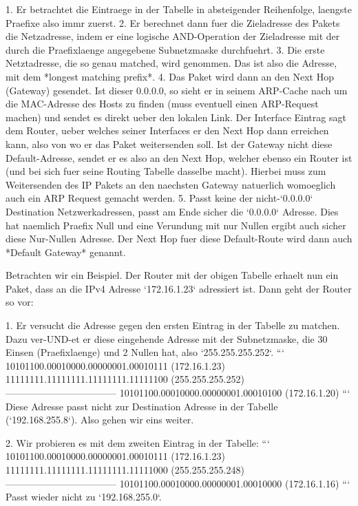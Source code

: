 1. Er betrachtet die Eintraege in der Tabelle in absteigender Reihenfolge,
   laengste Praefixe also immr zuerst.
2. Er berechnet dann fuer die Zieladresse des Pakets die Netzadresse, indem er
   eine logische AND-Operation der Zieladresse mit der durch die Praefixlaenge
   angegebene Subnetzmaske durchfuehrt.
3. Die erste Netztadresse, die so genau matched, wird genommen. Das ist also die
   Adresse, mit dem *longest matching prefix*.
4. Das Paket wird dann an den Next Hop (Gateway) gesendet. Ist dieser 0.0.0.0,
   so sieht er in seinem ARP-Cache nach um die MAC-Adresse des Hosts zu finden
   (muss eventuell einen ARP-Request machen) und sendet es direkt ueber den
   lokalen Link. Der Interface Eintrag sagt dem Router, ueber welches seiner
   Interfaces er den Next Hop dann erreichen kann, also von wo er das Paket
   weitersenden soll. Ist der Gateway nicht diese Default-Adresse, sendet er es
   also an den Next Hop, welcher ebenso ein Router ist (und bei sich fuer seine
   Routing Tabelle dasselbe macht). Hierbei muss zum Weitersenden des IP Pakets
   an den naechsten Gateway natuerlich womoeglich auch ein ARP Request gemacht
   werden.
5. Passt keine der nicht-`0.0.0.0` Destination Netzwerkadressen, passt am Ende
   sicher die `0.0.0.0` Adresse. Dies hat naemlich Praefix Null und eine Verundung
   mit nur Nullen ergibt auch sicher diese Nur-Nullen Adresse. Der Next Hop fuer
   diese Default-Route wird dann auch *Default Gateway* genannt.

Betrachten wir ein Beispiel. Der Router mit der obigen Tabelle erhaelt nun ein
Paket, dass an die IPv4 Adresse `172.16.1.23` adressiert ist. Dann geht der
Router so vor:

1. Er versucht die Adresse gegen den ersten Eintrag in der Tabelle zu
   matchen. Dazu ver-UND-et er diese eingehende Adresse mit der Subnetzmaske,
   die 30 Einsen (Praefixlaenge) und 2 Nullen hat, also `255.255.255.252`.
   ```
   10101100.00010000.00000001.00010111 (172.16.1.23)
   11111111.11111111.11111111.11111100 (255.255.255.252)
   -----------------------------------
   10101100.00010000.00000001.00010100 (172.16.1.20)
   ```
   Diese Adresse passt nicht zur Destination Adresse in der Tabelle
   (`192.168.255.8`). Also gehen wir eins weiter.

2. Wir probieren es mit dem zweiten Eintrag in der Tabelle:
   ```
   10101100.00010000.00000001.00010111 (172.16.1.23)
   11111111.11111111.11111111.11111000 (255.255.255.248)
   -----------------------------------
   10101100.00010000.00000001.00010000 (172.16.1.16)
   ```
   Passt wieder nicht zu `192.168.255.0`.

